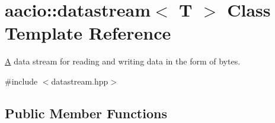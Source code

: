 \hypertarget{classaacio_1_1datastream}{}\section{aacio\+:\+:datastream$<$ T $>$ Class Template Reference}
\label{classaacio_1_1datastream}


\mbox{\hyperlink{struct_a}{A}} data stream for reading and writing data in the form of bytes.  




{\ttfamily \#include $<$datastream.\+hpp$>$}

\subsection*{Public Member Functions}
